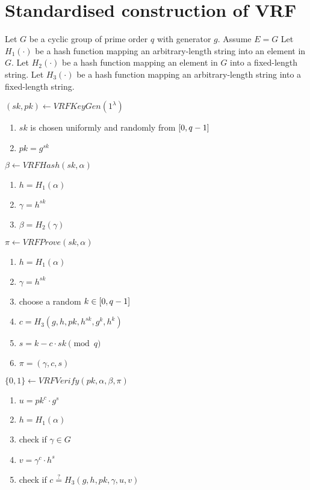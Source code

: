 \section{Standardised construction of VRF}

Let $G$ be a cyclic group of prime order $q$ with generator $g$. Assume $E = G$
Let $H_1(\cdot)$ be a hash function mapping an arbitrary-length string into an element in $G$.
Let $H_2(\cdot)$ be a hash function mapping an element in $G$ into a fixed-length string.
Let $H_3(\cdot)$ be a hash function mapping an arbitrary-length string into a fixed-length string.

\noindent $(sk, pk) \leftarrow VRFKeyGen(1^{\lambda})$
\begin{enumerate}
    \item $sk$ is chosen uniformly and randomly from $\interval{0}{q-1}$
    \item $pk = g^{sk}$
\end{enumerate}

\noindent $\beta \leftarrow VRFHash(sk, \alpha)$
\begin{enumerate}
    \item $h = H_{1}(\alpha)$
    \item $\gamma = h^{sk}$
    \item $\beta = H_{2}(\gamma)$
\end{enumerate}

\noindent $\pi \leftarrow VRFProve(sk, \alpha)$
\begin{enumerate}
    \item $h = H_{1}(\alpha)$
    \item $\gamma = h^{sk}$
    \item choose a random $k \in \interval{0}{q-1}$
    \item $c = H_{3}(g, h, pk, h^{sk}, g^{k}, h^{k})$
    \item $s = k - c \cdot sk \pmod{q}$
    \item $\pi = (\gamma, c, s)$
\end{enumerate}

\noindent $\{0, 1\} \leftarrow VRFVerify(pk, \alpha, \beta, \pi)$
\begin{enumerate}
    \item $u = pk^{c} \cdot g^{s}$
    \item $h = H_{1}(\alpha)$
    \item check if $\gamma \in G$
    \item $v = \gamma^{c} \cdot h^{s}$
    \item check if $c \stackrel{?}{=} H_{3}(g, h, pk, \gamma, u, v)$
\end{enumerate}
